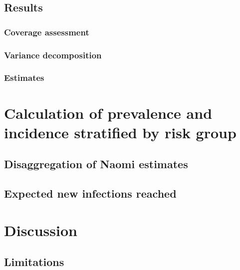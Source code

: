 \documentclass[a4paper, nobind]{templates/ociamthesis}
\begin{document}
\hypertarget{results-2}{%
\subsection{Results}\label{results-2}}

\hypertarget{coverage-assessment}{%
\subsubsection{Coverage assessment}\label{coverage-assessment}}

\hypertarget{variance-decomposition}{%
\subsubsection{Variance decomposition}\label{variance-decomposition}}

\hypertarget{estimates}{%
\subsubsection{Estimates}\label{estimates}}

\hypertarget{calculation-of-prevalence-and-incidence-stratified-by-risk-group}{%
\section{Calculation of prevalence and incidence stratified by risk group}\label{calculation-of-prevalence-and-incidence-stratified-by-risk-group}}

\hypertarget{disaggregation-of-naomi-estimates}{%
\subsection{Disaggregation of Naomi estimates}\label{disaggregation-of-naomi-estimates}}

\hypertarget{expected-new-infections-reached}{%
\subsection{Expected new infections reached}\label{expected-new-infections-reached}}

\hypertarget{discussion-1}{%
\section{Discussion}\label{discussion-1}}

\hypertarget{limitations-1}{%
\subsection{Limitations}\label{limitations-1}}
\end{document}

